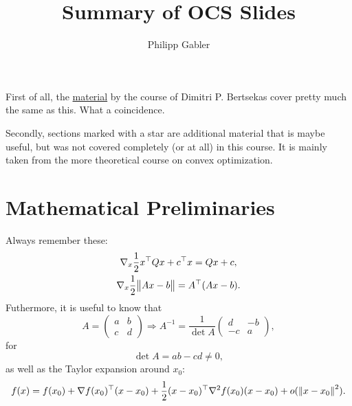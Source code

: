 \documentclass{article}
\title{Summary of OCS Slides}
\author{Philipp Gabler}
\begin{document}
\maketitle

\tableofcontents
\newpage


\noindent First of all, the \href{http://web.mit.edu/6.252/www/LectureNotes/}{material} by the
course of Dimitri P. Bertsekas cover pretty much the same as this. What a coincidence.

Secondly, sections marked with a star are additional material that is maybe useful, but was not
covered completely (or at all) in this course.  It is mainly taken from the more theoretical course
on convex optimization.

\section{Mathematical Preliminaries}



Always remember these:
\begin{gather*}
  \nabla_x \frac{1}{2} \T{x}Qx + \T{c}x = Qx + c, \\
  \nabla_x \frac{1}{2} \enVert[1]{Ax - b} = \T{A}(Ax - b).
\end{gather*}
Futhermore, it is useful to know that
\begin{equation*}
  A = \begin{pmatrix}
    a & b \\
    c & d
  \end{pmatrix} \Rightarrow A^{-1} = \frac{1}{\det A}
  \begin{pmatrix}
    d & -b \\
    -c & a
  \end{pmatrix},
\end{equation*}
for
\begin{equation*}
  \det A = ab - cd \neq 0,
\end{equation*}
as well as the Taylor expansion around \(x_0\):
\begin{equation*}
  f(x) = f(x_0) + \T{\nabla f(x_0)}(x - x_0) + \frac{1}{2} \T{(x - x_0)}\nabla^2 f(x_0)(x - x_0)
  + o(\,\enVert{x - x_0}^2).
\end{equation*}


\end{document}
